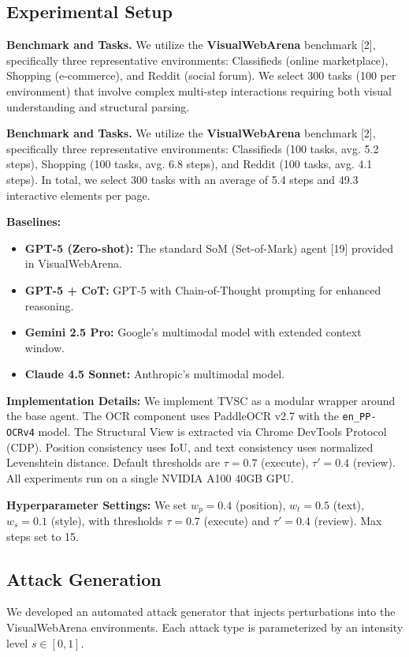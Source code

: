 \documentclass{llncs}
\begin{document}
\subsection{Experimental Setup}
\textbf{Benchmark and Tasks.} We utilize the \textbf{VisualWebArena} benchmark [2], specifically three representative environments: Classifieds (online marketplace), Shopping (e-commerce), and Reddit (social forum). We select 300 tasks (100 per environment) that involve complex multi-step interactions requiring both visual understanding and structural parsing.

\textbf{Benchmark and Tasks.} We utilize the \textbf{VisualWebArena} benchmark [2], specifically three representative environments: Classifieds (100 tasks, avg. 5.2 steps), Shopping (100 tasks, avg. 6.8 steps), and Reddit (100 tasks, avg. 4.1 steps). In total, we select 300 tasks with an average of 5.4 steps and 49.3 interactive elements per page.


\textbf{Baselines:}
\begin{itemize}
    \item \textbf{GPT-5 (Zero-shot):} The standard SoM (Set-of-Mark) agent [19] provided in VisualWebArena.
    \item \textbf{GPT-5 + CoT:} GPT-5 with Chain-of-Thought prompting for enhanced reasoning.
    \item \textbf{Gemini 2.5 Pro:} Google's multimodal model with extended context window.
    \item \textbf{Claude 4.5 Sonnet:} Anthropic's multimodal model.
\end{itemize}

\textbf{Implementation Details:}
We implement TVSC as a modular wrapper around the base agent. The OCR component uses PaddleOCR v2.7 with the \texttt{en\_PP-OCRv4} model. The Structural View is extracted via Chrome DevTools Protocol (CDP). Position consistency uses IoU, and text consistency uses normalized Levenshtein distance. Default thresholds are $\tau = 0.7$ (execute), $\tau' = 0.4$ (review). All experiments run on a single NVIDIA A100 40GB GPU.

\textbf{Hyperparameter Settings:}
We set $w_p=0.4$ (position), $w_t=0.5$ (text), $w_s=0.1$ (style), with thresholds $\tau=0.7$ (execute) and $\tau'=0.4$ (review). Max steps set to 15.


\subsection{Attack Generation}
We developed an automated attack generator that injects perturbations into the VisualWebArena environments. Each attack type is parameterized by an intensity level $s \in [0, 1]$.
\end{document}
